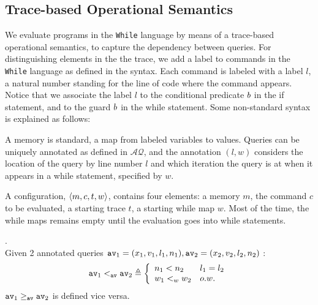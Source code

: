 \documentclass[a4paper,11pt]{article}
\begin{document}
\subsection{ Trace-based Operational Semantics}
{
We evaluate programs in the {\tt While} language by means of a trace-based operational semantics, to capture the dependency between queries. For distinguishing elements in the the trace, we add a label to commands in the {\tt While} language as defined in the syntax.
%
Each command is labeled with a label $l$, a natural number standing for the line of code where the command appears. Notice that we associate the label $l$ to the conditional predicate $b$ in the if statement, and to the guard $b$ in the while statement. Some non-standard syntax is explained as follows:  
%

{
A memory is standard, a map from labeled variables to values. 
Queries can be uniquely annotated as defined in $\mathcal{AQ}$, and the annotation $(l,w)$ considers the location of the query by line number $l$ and which iteration the query is at when it appears in a while statement, specified by $w$.
	}

A configuration, $\langle m, c, t,w \rangle$, contains four elements: a memory $m$, the command $c$ to be evaluated, a starting trace $t$, a starting while map $w$. Most of the time, the while maps remains empty until the evaluation goes into while statements.
\\
%
%
\begin{defn}.
\label{def:query_dir}
\\
Given 2 annotated queries 
$\mathtt{av}_1 = (x_1, v_1, l_1, n_1), 
\mathtt{av}_2 = (x_2, v_2, l_2, n_2)$
:
%
\[
\av_1 \avlt \av_2
 \triangleq 
 \left\{
 \begin{array}{ll}
    n_1 < n_2  
    & l_1 = l_2
    \\
    w_1 <_w w_2 & o.w. \wq{hard:-(}
\end{array}  
\right.
\]
%
$\mathtt{av}_1 \geq_{\mathtt{av}} \mathtt{av}_2$  is defined vice versa.
\end{defn}
}
\end{document}
